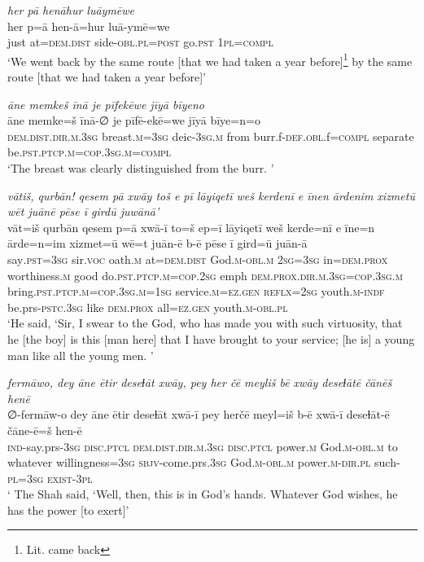 \ea \label{ZQ.34}
\textit{her pā henāhur luāymēwe} \\ 
\gll her p=ā hen-ā=hur luā-ymē=we \\ 
 just at=\textsc{dem.dist} side\textsc{-obl}\textsc{.pl}\textsc{=\textsc{post}} go\textsc{.pst} \textsc{1pl}\textsc{=compl} \\ 
\glt `We went back by the same route [that we had taken a year before]\footnote{Lit. came back} by the same route [that we had taken a year before]'
\z 
 
\ea \label{ZQ.41}
\textit{āne memkeš īnā je pīfekēwe jīyā bīyeno} \\ 
\gll āne memke=š īnā-∅ je pīfē-ekē=we jīyā bīye=n=o \\ 
 \textsc{dem.dist}\textsc{.dir}\textsc{.m}\textsc{.3sg} breast\textsc{.m}\textsc{=3sg} deic\textsc{-3sg}\textsc{.m} from burr.f\textsc{-def}\textsc{.obl}.f\textsc{=compl} separate be\textsc{.pst}\textsc{.ptcp}\textsc{.m}\textsc{=cop}\textsc{.3sg}\textsc{.m}\textsc{=compl} \\ 
\glt `The breast was clearly distinguished from the burr. '
\z 
 
\ea \label{ZQ.54}
\textit{vātiš, qurbān! qesem pā xwāy toš e pī lāyiqetī weš kerdenī e īnen ārdenim xizmetū wēt juānē pēse ī girdū juwānā’} \\ 
\gll vāt=iš qurbān qesem p=ā xwā-ī to=š ep=ī lāyiqetī weš kerde=nī e īne=n ārde=n=im xizmet=ū wē=t juān-ē b-ē pēse ī gird=ū juān-ā \\ 
 say\textsc{.pst}\textsc{=3sg} sir.\textsc{voc} oath\textsc{.m} at=\textsc{dem.dist} God\textsc{.m}\textsc{-obl}\textsc{.m} \textsc{2sg}\textsc{=3sg} in=\textsc{dem.prox} worthiness\textsc{.m} good do\textsc{.pst}\textsc{.ptcp}\textsc{.m}\textsc{=cop}\textsc{.\textsc{2sg}} emph \textsc{dem.prox}\textsc{.dir}\textsc{.m}\textsc{.3sg}\textsc{=cop}\textsc{.3sg}\textsc{.m} bring\textsc{.pst}\textsc{.ptcp}\textsc{.m}\textsc{=cop}\textsc{.3sg}\textsc{.m}\textsc{=\textsc{1sg}} service\textsc{.m}\textsc{=ez.gen} \textsc{reflx}\textsc{=\textsc{2sg}} youth\textsc{.m}\textsc{-indf} be.prs\textsc{-pstc}\textsc{.3sg} like \textsc{dem.prox} all\textsc{=ez.gen} youth\textsc{.m}\textsc{-obl}\textsc{.pl} \\ 
\glt `He said, ‘Sir, I swear to the God, who has made you with such virtuosity, that he [the boy] is this [man here] that I have brought to your service; [he is] a young man like all the young men. '
\z 
 
\ea \label{ZQ.55}
\textit{fermāwo, dey āne ētir deseɫāt xwāy, pey her čē meyliš bē xwāy deseɫātē čānēš henē} \\ 
\gll ∅-fermāw-o dey āne ētir deseɫāt xwā-ī pey herčē meyl=iš b-ē xwā-ī deseɫāt-ē čāne-ē=š hen-ē \\ 
 \textsc{ind-}say.prs\textsc{-3sg} \textsc{disc.ptcl} \textsc{dem.dist}\textsc{.dir}\textsc{.m}\textsc{.3sg} \textsc{disc.ptcl} power\textsc{.m} God\textsc{.m}\textsc{-obl}\textsc{.m} to whatever willingness\textsc{=3sg} \textsc{sbjv-}come.prs\textsc{.3sg} God\textsc{.m}\textsc{-obl}\textsc{.m} power\textsc{.m-dir.pl} such\textsc{-pl}\textsc{=3sg} \textsc{exist}\textsc{-3pl} \\ 
\glt ` The Shah said, ‘Well, then, this is in God’s hands. Whatever God wishes, he has the power [to exert]'
\z 
 
